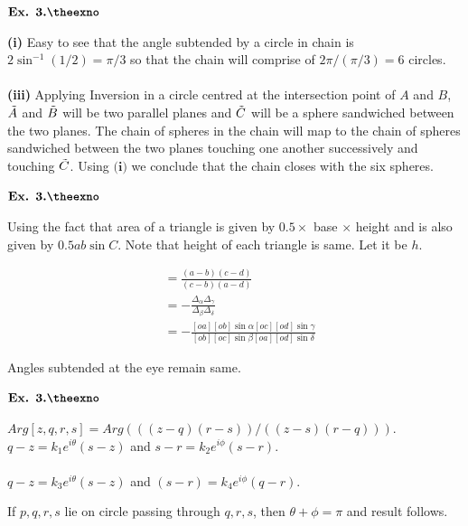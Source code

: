 \documentclass{article}
\def\tf{\textbf}
\def\td{\ensuremath\tilde}
\newcounter{exno}
\begin{document}
\vspace{0.2in}

${\textbf{Ex. 3.\theexno}}$
\addtocounter{exno}{1}

\tf{(i)} Easy to see that the angle subtended by a circle in chain is $2\sin^{-1}(1/2) = \pi/3$ so that the chain will comprise of $2\pi/(\pi/3) = 6$ circles.\\~\\

\tf{(iii)} Applying Inversion in a circle centred at the intersection point of $A$ and $B$, $\td{A}$ and $\td{B}$ will be two parallel planes and $\td{C}$ will be a sphere sandwiched between the two planes. The chain of spheres in the chain will map to the chain of spheres sandwiched between the two planes touching one another successively and touching $\td{C}$. Using $\tf{(i)}$ we conclude that the chain closes with the six spheres.

\vspace{0.2in}

${\textbf{Ex. 3.\theexno}}$
\addtocounter{exno}{1}

Using the fact that area of a triangle is given by $0.5 \times $ base $\times$ height and is also given by $0.5 ab \sin C$. Note that height of each triangle is same. Let it be $h$.

\begin{align*}
    [a,b,c,d] &= \frac{(a-b)(c-d)}{(c-b)(a-d)}\\
    &= -\frac{\Delta_{\alpha}\Delta_{\gamma}}{\Delta_{\beta}\Delta_{\delta}}\\
    &= -\frac{[oa][ob]\sin\alpha [oc][od]\sin\gamma}{[ob][oc]\sin\beta [oa][od]\sin\delta}
\end{align*}

Angles subtended at the eye remain same.

\vspace{0.2in}

${\textbf{Ex. 3.\theexno}}$
\addtocounter{exno}{1}

$Arg [z,q,r,s] = Arg(((z-q)(r-s))/((z-s)(r-q)))$. $q-z = k_1e^{i\theta}(s-z)$ and $s-r = k_2e^{i\phi}(s-r)$.\\~\\

$q-z = k_3e^{i\theta}(s-z)$ and $(s-r)=k_4e^{i\phi} (q-r)$.

If $p,q,r,s$ lie on circle passing through $q,r,s$, then $\theta+\phi=\pi$ and result follows.
\end{document}
